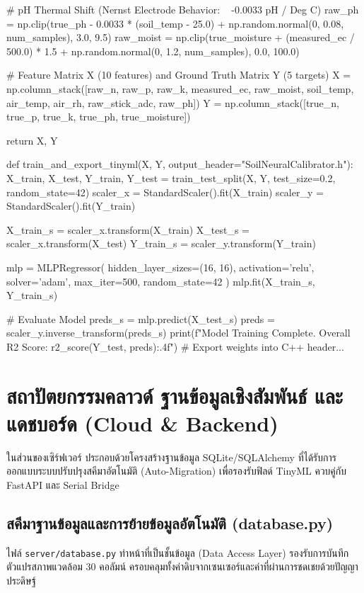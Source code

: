 \begin{pythonbox}
    # pH Thermal Shift (Nernst Electrode Behavior: ~ -0.0033 pH / Deg C)
    raw_ph = np.clip(true_ph - 0.0033 * (soil_temp - 25.0) + np.random.normal(0, 0.08, num_samples), 3.0, 9.5)
    raw_moist = np.clip(true_moisture + (measured_ec / 500.0) * 1.5 + np.random.normal(0, 1.2, num_samples), 0.0, 100.0)

    # Feature Matrix X (10 features) and Ground Truth Matrix Y (5 targets)
    X = np.column_stack([raw_n, raw_p, raw_k, measured_ec, raw_moist, soil_temp, air_temp, air_rh, raw_stick_adc, raw_ph])
    Y = np.column_stack([true_n, true_p, true_k, true_ph, true_moisture])

    return X, Y

def train_and_export_tinyml(X, Y, output_header="SoilNeuralCalibrator.h"):
    X_train, X_test, Y_train, Y_test = train_test_split(X, Y, test_size=0.2, random_state=42)
    scaler_x = StandardScaler().fit(X_train)
    scaler_y = StandardScaler().fit(Y_train)

    X_train_s = scaler_x.transform(X_train)
    X_test_s = scaler_x.transform(X_test)
    Y_train_s = scaler_y.transform(Y_train)

    mlp = MLPRegressor(
        hidden_layer_sizes=(16, 16),
        activation='relu',
        solver='adam',
        max_iter=500,
        random_state=42
    )
    mlp.fit(X_train_s, Y_train_s)

    # Evaluate Model
    preds_s = mlp.predict(X_test_s)
    preds = scaler_y.inverse_transform(preds_s)
    print(f"Model Training Complete. Overall R2 Score: {r2_score(Y_test, preds):.4f}")
    # Export weights into C++ header...
\end{pythonbox}

\newpage
\section{สถาปัตยกรรมคลาวด์ ฐานข้อมูลเชิงสัมพันธ์ และแดชบอร์ด (Cloud \& Backend)}

ในส่วนของเซิร์ฟเวอร์ ประกอบด้วยโครงสร้างฐานข้อมูล SQLite/SQLAlchemy ที่ได้รับการออกแบบระบบปรับปรุงสคีมาอัตโนมัติ (Auto-Migration) เพื่อรองรับฟิลด์ TinyML ควบคู่กับ FastAPI และ Serial Bridge

\subsection{สคีมาฐานข้อมูลและการย้ายข้อมูลอัตโนมัติ (database.py)}
ไฟล์ \texttt{server/database.py} ทำหน้าที่เป็นชั้นข้อมูล (Data Access Layer) รองรับการบันทึกตัวแปรสภาพแวดล้อม 30 คอลัมน์ ครอบคลุมทั้งค่าดิบจากเซนเซอร์และค่าที่ผ่านการชดเชยด้วยปัญญาประดิษฐ์


